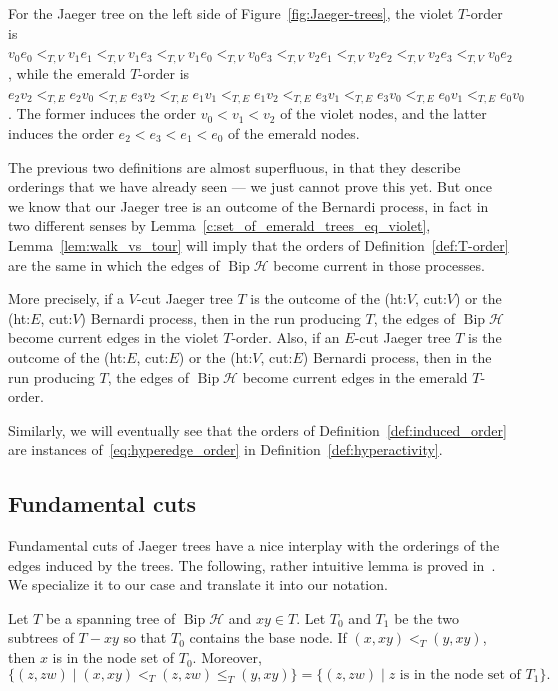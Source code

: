 \documentclass[ALCO,ThmDefs,Unicode,epreuves]{cedram}
\newcommand{\HH}{\mathcal H}
\DeclareMathOperator{\bip}{Bip}
\begin{document}
\begin{exam}
For the Jaeger tree on the left side of Figure~\ref{fig:Jaeger-trees}, the violet $T$-order is $v_0e_0<_{T,V}v_1e_1<_{T,V}v_1e_3<_{T,V}v_1e_0<_{T,V}v_0e_3<_{T,V}v_2e_1<_{T,V}v_2e_2<_{T,V}v_2e_3<_{T,V}v_0e_2$, while the emerald $T$-order is $e_2v_2<_{T,E}e_2v_0<_{T,E}e_3v_2<_{T,E}e_1v_1<_{T,E}e_1v_2<_{T,E}e_3v_1<_{T,E}e_3v_0<_{T,E}e_0v_1<_{T,E}e_0v_0$. The former induces the order $v_0<v_1<v_2$ of the violet nodes, and the latter induces the order $e_2<e_3<e_1<e_0$ of the emerald nodes.
\end{exam}

\begin{rema}\label{f:orders}
The previous two definitions are almost superfluous, in that they describe orderings that we have already seen --- we just cannot prove this yet. But once we know that our Jaeger tree is an outcome of the Bernardi process, in fact in two different senses by Lemma~\ref{c:set_of_emerald_trees_eq_violet}, Lemma~\ref{lem:walk_vs_tour} will imply that the orders of Definition~\ref{def:T-order} are the same in which the edges of $\bip\HH$ become current in those processes.

More precisely, if a $V$-cut Jaeger tree $T$ is the outcome of the (ht:$V$, cut:$V$) or the (ht:$E$, cut:$V$) Bernardi process, then in the run producing $T$, the edges of $\bip \HH$ become current edges in the violet $T$-order. 
Also, if an $E$-cut Jaeger tree $T$ is the outcome of the (ht:$E$, cut:$E$) or the (ht:$V$, cut:$E$) Bernardi process, then in the run producing $T$, the edges of $\bip \HH$ become current edges in the emerald $T$-order.

Similarly, we will eventually see that the orders of Definition~\ref{def:induced_order} are instances of~\eqref{eq:hyperedge_order} in Definition~\ref{def:hyperactivity}.
\end{rema}


\subsection{Fundamental cuts} 

Fundamental cuts of Jaeger trees have a nice interplay with the orderings of the edges induced by the trees. The following, rather intuitive lemma is proved in~\cite{Bernardi_Tutte}. We specialize it to our case and translate it into our notation.

\begin{lemma}\label{l:parents_in_T-order} \cite[Lemma~5]{Bernardi_Tutte}
	Let $T$ be a spanning tree of $\bip \HH$ and $xy\in T$. Let $T_0$ and $T_1$ be the two subtrees of $T-xy$ so that $T_0$ contains the base node. If $(x,xy) <_T (y,xy)$, then $x$ is in the node set of $T_0$. Moreover, 
\[\{(z,zw)\mid (x,xy) <_T (z,zw) \leq_T (y,xy)\}=\{(z,zw)\mid z\text{ is in the node set of } T_1\}.\]
\end{lemma}
\end{document}
